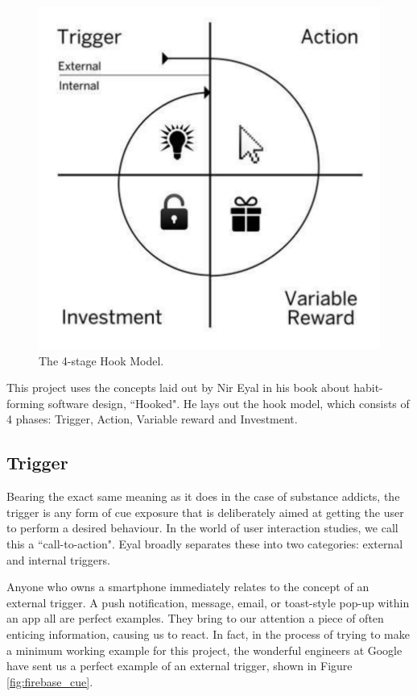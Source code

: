 \begin{figure}[h]
    \begin{center}
        \includegraphics[scale=0.3]{images/hook_model.png}
    \end{center}
    \caption{The 4-stage Hook Model.}
    \label{hook_model}
\end{figure}

This project uses the concepts laid out by Nir Eyal \cite{eyal2014hooked} in his book about habit-forming software design, ``Hooked". He lays out the hook model, which consists of 4 phases: Trigger, Action, Variable reward and Investment.

\subsection{Trigger}
Bearing the exact same meaning as it does in the case of substance addicts, the trigger is any form of cue exposure that is deliberately aimed at getting the user to perform a desired behaviour. In the world of user interaction studies, we call this a ``call-to-action".  Eyal broadly separates these into two categories: external and internal triggers.

Anyone who owns a smartphone immediately relates to the concept of an external trigger. A push notification, message, email, or toast-style pop-up within an app all are perfect examples. They bring to our attention a piece of often enticing information, causing us to react. In fact, in the process of trying to make a minimum working example for this project, the wonderful engineers at Google have sent us a perfect example of an external trigger, shown in Figure \ref{fig:firebase_cue}.


